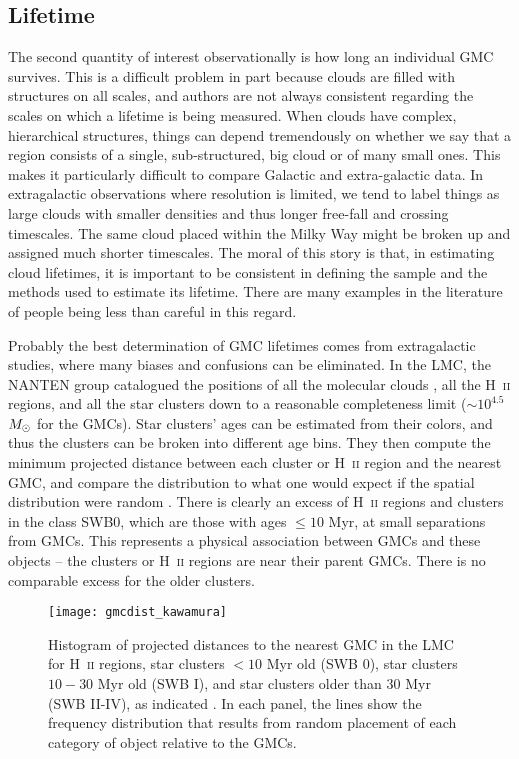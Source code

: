 \subsection{Lifetime}

The second quantity of interest observationally is how long an individual GMC survives. This is a difficult problem in part because clouds are filled with structures on all scales, and authors are not always consistent regarding the scales on which a lifetime is being measured. When clouds have complex, hierarchical structures, things can depend tremendously on whether we say that a region consists of a single, sub-structured, big cloud or of many small ones. This makes it particularly difficult to compare Galactic and extra-galactic data. In extragalactic observations where resolution is limited, we tend to label things as large clouds with smaller densities and thus longer free-fall and crossing timescales. The same cloud placed within the Milky Way might be broken up and assigned much shorter timescales. The moral of this story is that, in estimating cloud lifetimes, it is important to be consistent in defining the sample and the methods used to estimate its lifetime. There are many examples in the literature of people being less than careful in this regard.

Probably the best determination of GMC lifetimes comes from extragalactic studies, where many biases and confusions can be eliminated. In the LMC, the NANTEN group catalogued the positions of all the molecular clouds \citet{fukui08a}, all the H~\textsc{ii} regions, and all the star clusters down to a reasonable completeness limit ($\sim 10^{4.5}$ $M_{\odot}$ for the GMCs). Star clusters' ages can be estimated from their colors, and thus the clusters can be broken into different age bins. They then compute the minimum projected distance between each cluster or H~\textsc{ii} region and the nearest GMC, and compare the distribution to what one would expect if the spatial distribution were random \citet[Figure \ref{fig:gmcdist_kawamura}]{kawamura09a}. There is clearly an excess of H~\textsc{ii} regions and clusters in the class SWB0, which are those with ages $\leq 10$ Myr, at small separations from GMCs. This represents a physical association between GMCs and these objects -- the clusters or H~\textsc{ii} regions are near their parent GMCs. There is no comparable excess for the older clusters. 

\begin{figure}
\texttt{[image: gmcdist\_kawamura]}
\caption[Histogram of distances to nearest GMC]{
\label{fig:gmcdist_kawamura}
Histogram of projected distances to the nearest GMC in the LMC for H~\textsc{ii} regions, star clusters $<10$ Myr old (SWB 0), star clusters $10-30$ Myr old (SWB I), and star clusters older than 30 Myr (SWB II-IV), as indicated \citep{kawamura09a}. In each panel, the lines show the frequency distribution that results from random placement of each category of object relative to the GMCs.
}
\end{figure}

